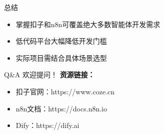 \begin{frame}{总结}
\begin{itemize}
\item 掌握扣子和n8n可覆盖绝大多数智能体开发需求
\item 低代码平台大幅降低开发门槛
\item 实际项目需结合具体场景选型
\end{itemize}
\end{frame}

\begin{frame}{Q\&A}
欢迎提问！
\vspace{1cm}
\textbf{资源链接：}
\begin{itemize}
\item 扣子官网：https://www.coze.cn
\item n8n文档：https://docs.n8n.io
\item Dify：https://dify.ai
\end{itemize}
\end{frame}
